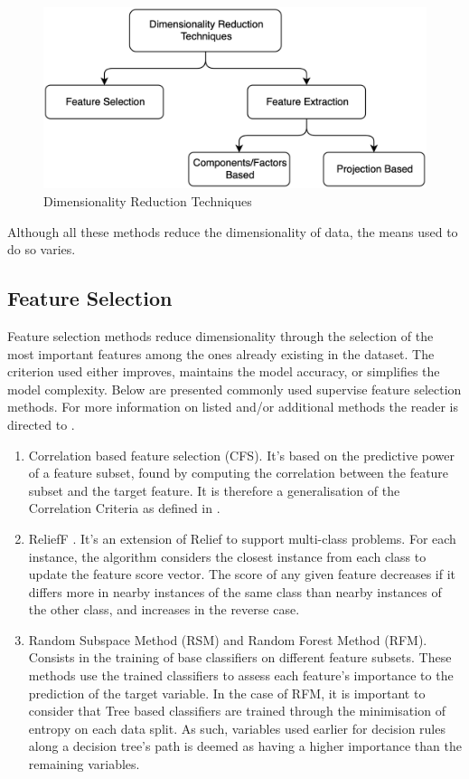 \documentclass[12pt, english, openany]{book}
\begin{document}
\begin{figure}[H]
	\centering
	\includegraphics[width=.8\linewidth]{dimensionality_reduction.png}
  \caption{Dimensionality Reduction Techniques}
  \label{fig:dimensionality-reduction}
\end{figure}

Although all these methods reduce the dimensionality of data, the means used to
do so varies.

\subsection*{Feature Selection}

Feature selection methods reduce dimensionality through the selection of the
most important features among the ones already existing in the dataset. The
criterion used either improves, maintains the model accuracy, or simplifies the
model complexity. Below are presented commonly used supervise feature selection
methods. For more information on listed and/or additional methods the reader is
directed to \cite{Cai2018, Ghojogh2019}.

\begin{enumerate}
  \item Correlation based feature selection (CFS). It's based on the predictive
  power of a feature subset, found by computing the correlation between the
  feature subset and the target feature. It is therefore a generalisation
  of the Correlation Criteria as defined in \cite{Ghojogh2019}.
  \item ReliefF \cite{kononenko1997}. It's an extension of Relief
  \cite{kira1992} to support multi-class problems. For each instance, the
  algorithm considers the closest instance from each class to update the
  feature score vector. The score of any given feature decreases if it differs
  more in nearby instances of the same class than nearby instances of the other
  class, and increases in the reverse case.
  \item Random Subspace Method (RSM) and Random Forest Method (RFM). Consists
  in the training of base classifiers on different feature subsets. These
  methods use the trained classifiers to assess each feature's importance to
  the prediction of the target variable. In the case of RFM, it is important to
  consider that Tree based classifiers are trained through the minimisation of
  entropy on each data split. As such, variables used earlier for decision
  rules along a decision tree's path is deemed as having a higher importance
  than the remaining variables.
\end{enumerate}
\end{document}
